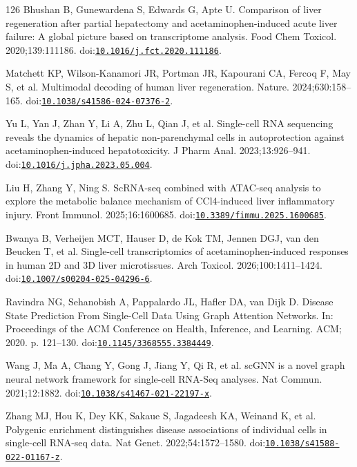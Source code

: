 \begin{thebibliography}{126}
Bhushan B, Gunewardena S, Edwards G, Apte U. Comparison of liver regeneration after partial hepatectomy and acetaminophen-induced acute liver failure: A global picture based on transcriptome analysis. Food Chem Toxicol. 2020;139:111186. doi:\href{https://doi.org/10.1016/j.fct.2020.111186}{\nolinkurl{10.1016/j.fct.2020.111186}}.

Matchett KP, Wilson-Kanamori JR, Portman JR, Kapourani CA, Fercoq F, May S, et al. Multimodal decoding of human liver regeneration. Nature. 2024;630:158--165. doi:\href{https://doi.org/10.1038/s41586-024-07376-2}{\nolinkurl{10.1038/s41586-024-07376-2}}.

Yu L, Yan J, Zhan Y, Li A, Zhu L, Qian J, et al. Single-cell RNA sequencing reveals the dynamics of hepatic non-parenchymal cells in autoprotection against acetaminophen-induced hepatotoxicity. J Pharm Anal. 2023;13:926--941. doi:\href{https://doi.org/10.1016/j.jpha.2023.05.004}{\nolinkurl{10.1016/j.jpha.2023.05.004}}.

Liu H, Zhang Y, Ning S. ScRNA-seq combined with ATAC-seq analysis to explore the metabolic balance mechanism of CCl4-induced liver inflammatory injury. Front Immunol. 2025;16:1600685. doi:\href{https://doi.org/10.3389/fimmu.2025.1600685}{\nolinkurl{10.3389/fimmu.2025.1600685}}.

Bwanya B, Verheijen MCT, Hauser D, de Kok TM, Jennen DGJ, van den Beucken T, et al. Single-cell transcriptomics of acetaminophen-induced responses in human 2D and 3D liver microtissues. Arch Toxicol. 2026;100:1411--1424. doi:\href{https://doi.org/10.1007/s00204-025-04296-6}{\nolinkurl{10.1007/s00204-025-04296-6}}.

Ravindra NG, Sehanobish A, Pappalardo JL, Hafler DA, van Dijk D. Disease State Prediction From Single-Cell Data Using Graph Attention Networks. In: Proceedings of the ACM Conference on Health, Inference, and Learning. ACM; 2020. p. 121--130. doi:\href{https://doi.org/10.1145/3368555.3384449}{\nolinkurl{10.1145/3368555.3384449}}.

Wang J, Ma A, Chang Y, Gong J, Jiang Y, Qi R, et al. scGNN is a novel graph neural network framework for single-cell RNA-Seq analyses. Nat Commun. 2021;12:1882. doi:\href{https://doi.org/10.1038/s41467-021-22197-x}{\nolinkurl{10.1038/s41467-021-22197-x}}.

Zhang MJ, Hou K, Dey KK, Sakaue S, Jagadeesh KA, Weinand K, et al. Polygenic enrichment distinguishes disease associations of individual cells in single-cell RNA-seq data. Nat Genet. 2022;54:1572--1580. doi:\href{https://doi.org/10.1038/s41588-022-01167-z}{\nolinkurl{10.1038/s41588-022-01167-z}}.


\end{thebibliography}
